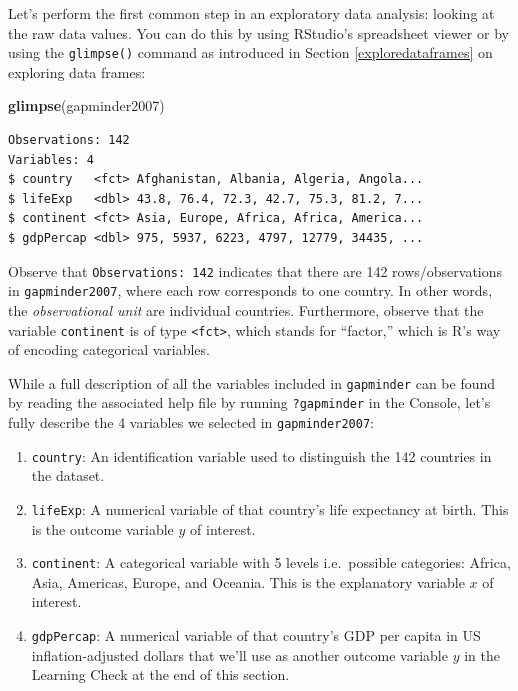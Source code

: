 \documentclass[12pt, krantz2,]{krantz}
\makeatletter
\newenvironment{Shaded}{\begin{snugshade}}{\end{snugshade}}
\newcommand{\KeywordTok}[1]{\textcolor[rgb]{0.27,0.27,0.27}{\textbf{#1}}}
\newcommand{\NormalTok}[1]{#1}
\providecommand{\tightlist}{%
  \setlength{\itemsep}{0pt}\setlength{\parskip}{0pt}}
\newenvironment{kframe}{%
\medskip{}
\setlength{\fboxsep}{.8em}
 \def\at@end@of@kframe{}%
 \ifinner\ifhmode%
  \def\at@end@of@kframe{\end{minipage}}%
  \begin{minipage}{\columnwidth}%
 \fi\fi%
 \def\FrameCommand##1{\hskip\@totalleftmargin \hskip-\fboxsep
 \colorbox{shadecolor}{##1}\hskip-\fboxsep
     \hskip-\linewidth \hskip-\@totalleftmargin \hskip\columnwidth}%
 \MakeFramed {\advance\hsize-\width
   \@totalleftmargin\z@ \linewidth\hsize
   \@setminipage}}%
 {\par\unskip\endMakeFramed%
 \at@end@of@kframe}
\renewenvironment{Shaded}{\begin{kframe}}{\end{kframe}}
\makeatother
\begin{document}
Let's perform the first common step in an exploratory data analysis: looking at the raw data values. You can do this by using RStudio's spreadsheet viewer or by using the \texttt{glimpse()} command as introduced in Section \ref{exploredataframes} on exploring data frames:

\begin{Shaded}
\begin{Highlighting}[]
\KeywordTok{glimpse}\NormalTok{(gapminder2007)}
\end{Highlighting}
\end{Shaded}

\begin{verbatim}
Observations: 142
Variables: 4
$ country   <fct> Afghanistan, Albania, Algeria, Angola...
$ lifeExp   <dbl> 43.8, 76.4, 72.3, 42.7, 75.3, 81.2, 7...
$ continent <fct> Asia, Europe, Africa, Africa, America...
$ gdpPercap <dbl> 975, 5937, 6223, 4797, 12779, 34435, ...
\end{verbatim}

Observe that \texttt{Observations:\ 142} indicates that there are 142 rows/observations in \texttt{gapminder2007}, where each row corresponds to one country. In other words, the \emph{observational unit} are individual countries. Furthermore, observe that the variable \texttt{continent} is of type \texttt{\textless{}fct\textgreater{}}, which stands for ``factor,'' which is R's way of encoding categorical variables.

While a full description of all the variables included in \texttt{gapminder} can be found by reading the associated help file by running \texttt{?gapminder} in the Console, let's fully describe the 4 variables we selected in \texttt{gapminder2007}:

\begin{enumerate}
\def\labelenumi{\arabic{enumi}.}
\tightlist
\item
  \texttt{country}: An identification variable used to distinguish the 142 countries in the dataset.
\item
  \texttt{lifeExp}: A numerical variable of that country's life expectancy at birth. This is the outcome variable \(y\) of interest.
\item
  \texttt{continent}: A categorical variable with 5 levels i.e.~possible categories: Africa, Asia, Americas, Europe, and Oceania. This is the explanatory variable \(x\) of interest.
\item
  \texttt{gdpPercap}: A numerical variable of that country's GDP per capita in US inflation-adjusted dollars that we'll use as another outcome variable \(y\) in the Learning Check at the end of this section.
\end{enumerate}
\end{document}
